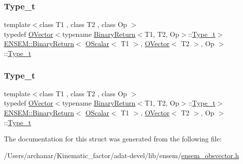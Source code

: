 \subsubsection{\texorpdfstring{Type\_t}{Type\_t}\hspace{0.1cm}{\footnotesize\ttfamily [2/3]}}
{\footnotesize\ttfamily template$<$class T1 , class T2 , class Op $>$ \\
typedef \mbox{\hyperlink{classENSEM_1_1OVector}{O\+Vector}}$<$typename \mbox{\hyperlink{structENSEM_1_1BinaryReturn}{Binary\+Return}}$<$T1, T2, Op$>$\+::\mbox{\hyperlink{structENSEM_1_1BinaryReturn_3_01OScalar_3_01T1_01_4_00_01OVector_3_01T2_01_4_00_01Op_01_4_ab27873926cc30b187ec230fa31f23dae}{Type\+\_\+t}}$>$ \mbox{\hyperlink{structENSEM_1_1BinaryReturn}{E\+N\+S\+E\+M\+::\+Binary\+Return}}$<$ \mbox{\hyperlink{classENSEM_1_1OScalar}{O\+Scalar}}$<$ T1 $>$, \mbox{\hyperlink{classENSEM_1_1OVector}{O\+Vector}}$<$ T2 $>$, Op $>$\+::\mbox{\hyperlink{structENSEM_1_1BinaryReturn_3_01OScalar_3_01T1_01_4_00_01OVector_3_01T2_01_4_00_01Op_01_4_ab27873926cc30b187ec230fa31f23dae}{Type\+\_\+t}}}

\mbox{\label{structENSEM_1_1BinaryReturn_3_01OScalar_3_01T1_01_4_00_01OVector_3_01T2_01_4_00_01Op_01_4_ab27873926cc30b187ec230fa31f23dae}} 
\subsubsection{\texorpdfstring{Type\_t}{Type\_t}\hspace{0.1cm}{\footnotesize\ttfamily [3/3]}}
{\footnotesize\ttfamily template$<$class T1 , class T2 , class Op $>$ \\
typedef \mbox{\hyperlink{classENSEM_1_1OVector}{O\+Vector}}$<$typename \mbox{\hyperlink{structENSEM_1_1BinaryReturn}{Binary\+Return}}$<$T1, T2, Op$>$\+::\mbox{\hyperlink{structENSEM_1_1BinaryReturn_3_01OScalar_3_01T1_01_4_00_01OVector_3_01T2_01_4_00_01Op_01_4_ab27873926cc30b187ec230fa31f23dae}{Type\+\_\+t}}$>$ \mbox{\hyperlink{structENSEM_1_1BinaryReturn}{E\+N\+S\+E\+M\+::\+Binary\+Return}}$<$ \mbox{\hyperlink{classENSEM_1_1OScalar}{O\+Scalar}}$<$ T1 $>$, \mbox{\hyperlink{classENSEM_1_1OVector}{O\+Vector}}$<$ T2 $>$, Op $>$\+::\mbox{\hyperlink{structENSEM_1_1BinaryReturn_3_01OScalar_3_01T1_01_4_00_01OVector_3_01T2_01_4_00_01Op_01_4_ab27873926cc30b187ec230fa31f23dae}{Type\+\_\+t}}}



The documentation for this struct was generated from the following file\+:\begin{DoxyCompactItemize}
\item 
/\+Users/archanar/\+Kinematic\+\_\+factor/adat-\/devel/lib/ensem/\mbox{\hyperlink{adat-devel_2lib_2ensem_2ensem__obsvector_8h}{ensem\+\_\+obsvector.\+h}}\end{DoxyCompactItemize}
